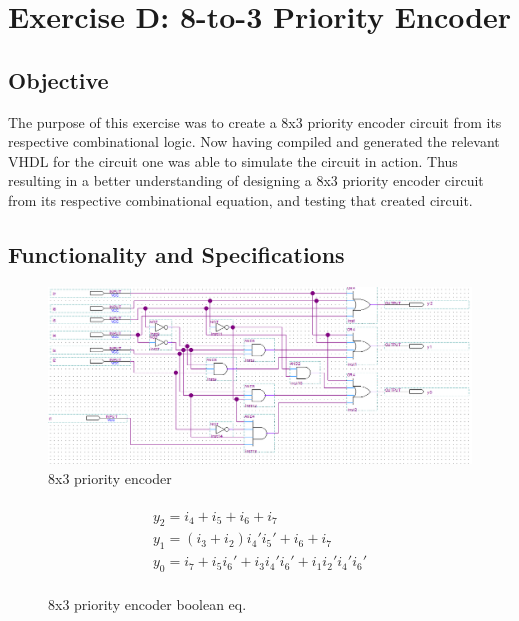 \documentclass[12pt]{article}
\begin{document}
\clearpage
\section{Exercise D: 8-to-3 Priority Encoder}
\subsection{Objective}
The purpose of this exercise was to create a 8x3 priority encoder circuit from its respective combinational logic. Now having compiled and generated the relevant VHDL for the circuit one was able to simulate the circuit in action. Thus resulting in a better understanding of designing a 8x3 priority encoder circuit from its respective combinational equation, and testing that created circuit.

\subsection{Functionality and Specifications}

\begin{figure}[h]
\caption{8x3 priority encoder}
\centering
\includegraphics[width=\textwidth]{./diagrams/8x3_penc_design.png}
\end{figure}

\begin{figure}[h]
    \begin{multline}
        \\y_2 = i_4+i_5+i_6+i_7 \\
        y_1 = (i_3+i_2)i_4'i_5'+i_6+i_7 \\
        y_0 = i_7+i_5i_6'+i_3i_4'i_6'+i_1i_2'i_4'i_6' \\
    \end{multline}
    \caption{8x3 priority encoder boolean eq.}
\end{figure}
\end{document}

